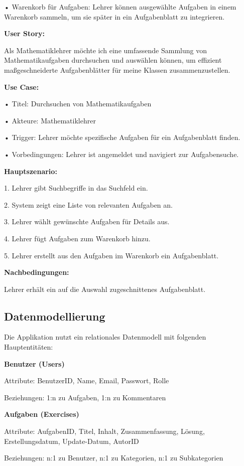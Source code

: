 \documentclass[12pt,a4paper]{article} %
\begin{document}
•	    Warenkorb für Aufgaben: Lehrer können ausgewählte Aufgaben in einem Warenkorb sammeln, um sie später in ein Aufgabenblatt zu integrieren.

\textbf{User Story: }

Als Mathematiklehrer möchte ich eine umfassende Sammlung von Mathematikaufgaben durchsuchen und auswählen können, um effizient maßgeschneiderte Aufgabenblätter für meine Klassen zusammenzustellen.

\textbf{Use Case:}

•	   Titel: Durchsuchen von Mathematikaufgaben

•	   Akteure: Mathematiklehrer

•	   Trigger: Lehrer möchte spezifische Aufgaben für ein Aufgabenblatt finden.

•	   Vorbedingungen: Lehrer ist angemeldet und navigiert zur Aufgabensuche.

\textbf{Hauptszenario:}

1. Lehrer gibt Suchbegriffe in das Suchfeld ein.

2. System zeigt eine Liste von relevanten Aufgaben an.

3. Lehrer wählt gewünschte Aufgaben für Details aus.

4. Lehrer fügt Aufgaben zum Warenkorb hinzu.

5. Lehrer erstellt aus den Aufgaben im Warenkorb ein Aufgabenblatt.

\textbf{Nachbedingungen:}

Lehrer erhält ein auf die Auswahl zugeschnittenes Aufgabenblatt.


\subsection{Datenmodellierung}

Die Applikation nutzt ein relationales Datenmodell mit folgenden Hauptentitäten:

   \textbf{ Benutzer (Users)}

        Attribute: BenutzerID, Name, Email, Passwort, Rolle

        Beziehungen: 1:n zu Aufgaben, 1:n zu Kommentaren

    \textbf{Aufgaben (Exercises)}

        Attribute: AufgabenID, Titel, Inhalt, Zusammenfassung, Lösung, Erstellungsdatum, Update-Datum, AutorID

        Beziehungen: n:1 zu Benutzer, n:1 zu Kategorien, n:1 zu Subkategorien
\end{document}
